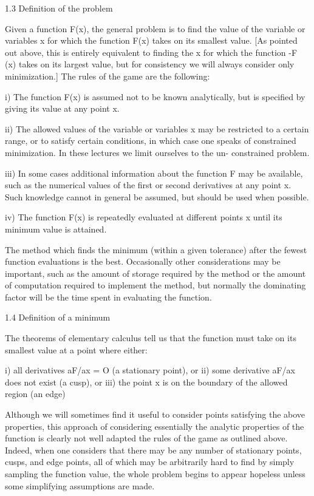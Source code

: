  
1.3  Definition of the problem
 
      Given a function F(x), the general problem is to find the value of
the variable or variables x for which the function F(x) takes on its
smallest value.  [As pointed out above, this is entirely equivalent to
finding the x for which the function -F (x) takes on its largest value,
but for consistency we will always consider only minimization.]  The
rules of the game are the following:
 
  i) The function F(x) is assumed not to be known analytically, but is
     specified by giving its value at any point x.
 
 ii) The allowed values of the variable or variables x may be restricted
     to a certain range, or to satisfy certain conditions,
     in which case one speaks of constrained
     minimization.  In these lectures we limit ourselves to the un-
     constrained problem.
 
iii) In some cases additional information about the function F may be
     available, such as the numerical values of the 
     first or second derivatives at any point x.  
     Such knowledge cannot in general be assumed, but
     should be used when possible.
 
 iv) The function F(x) is repeatedly evaluated at different points x
     until its minimum value is attained.
 
The method which finds the minimum (within a given tolerance) after the
fewest function evaluations is the best.  Occasionally other considerations
may be important, such as the amount of storage required by the
method  or the amount of computation required to implement the method,
but normally the dominating factor will be the time spent in evaluating
the function.
 
 
1.4  Definition of a minimum
 
     The theorems of elementary calculus tell us that the function
must take on its smallest value at a point where either:
 
  i) all derivatives aF/ax = O (a stationary point), or
 ii) some derivative aF/ax does not exist (a cusp), or
iii) the point x is on the boundary of the allowed region (an edge)
 
     Although we will sometimes find it useful to consider points 
satisfying the above properties, this approach of considering essentially
the analytic properties of the function is clearly not well adapted
the rules of the game as outlined above.  Indeed, when one considers that
there may be any number of stationary points, cusps, and edge points,
all of which may be arbitrarily hard to find by simply sampling the
function value, the whole problem begins to appear hopeless unless some
simplifying assumptions are made.
 
